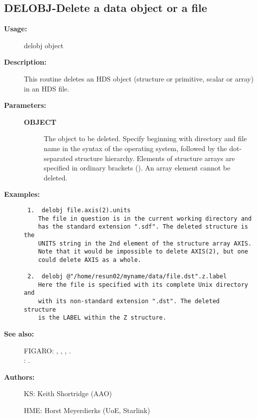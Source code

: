 \subsection{DELOBJ-\label{DELOBJ}Delete a data object or a file}
\begin{description}

\item [{\bf Usage:}]
 delobj object

\item [{\bf Description:}]
 This routine deletes an HDS object (structure or primitive, scalar
 or array) in an HDS file.

\item [{\bf Parameters:}]
\begin{description}
\item [{\bf OBJECT}]
 The object to be deleted. Specify beginning with directory and
 file name in the syntax of the operating system, followed by
 the dot-separated structure hierarchy. Elements of structure
 arrays are specified in ordinary brackets (). An array element
 cannot be deleted.
\end{description}

\item [{\bf Examples:}]
\begin{verbatim}
 1.  delobj file.axis(2).units
    The file in question is in the current working directory and
    has the standard extension ".sdf". The deleted structure is the
    UNITS string in the 2nd element of the structure array AXIS.
    Note that it would be impossible to delete AXIS(2), but one
    could delete AXIS as a whole.

 2.  delobj @"/home/resun02/myname/data/file.dst".z.label
    Here the file is specified with its complete Unix directory and
    with its non-standard extension ".dst". The deleted structure
    is the LABEL within the Z structure.

\end{verbatim}

\item [{\bf See also:}]
FIGARO: , , , .\\
: .\\

\item [{\bf Authors:}]
 KS: Keith Shortridge (AAO)

 HME: Horst Meyerdierks (UoE, Starlink)
\end{description}
